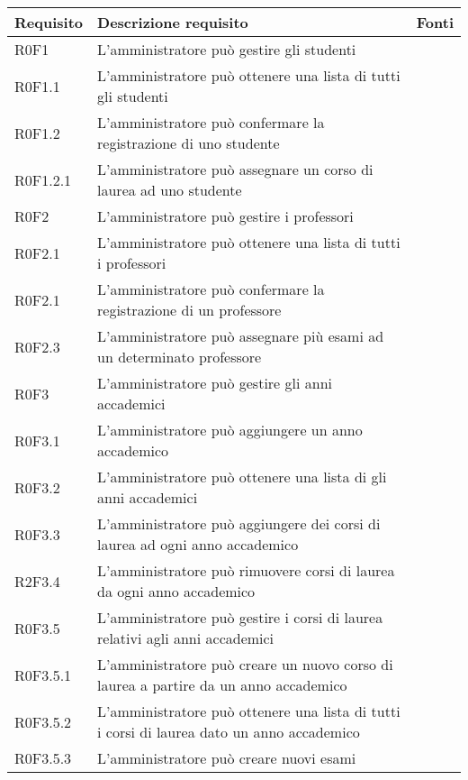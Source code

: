 \documentclass[AnalisiDeiRequisiti.tex]{subfiles}
\begin{document}
\label{table:Tabella di tracciamento requisiti-fonti}
\begin{longtable}[H]{|p{2cm}|p{5cm}|p{5cm}|}
	\hline
	\rowcolor[HTML]{38FFF8} 
	\textbf{Requisito} & \textbf{Descrizione requisito} & \textbf{Fonti} \\ \hline
	\endhead
	R0F1 &  L'amministratore può gestire gli studenti &  \\ \hline
	R0F1.1 &  L'amministratore può ottenere una lista di tutti gli studenti &  \\ \hline
	R0F1.2 &  L'amministratore può confermare la registrazione di uno studente &  \\ \hline
	R0F1.2.1 &  L'amministratore può assegnare un corso di laurea ad uno studente &  \\ \hline
	R0F2 &  L'amministratore può gestire i professori &  \\ \hline
	R0F2.1 &  L'amministratore può ottenere una lista di tutti i professori &  \\ \hline
	R0F2.1 &  L'amministratore può confermare la registrazione di un professore &  \\ \hline
	R0F2.3 &  L'amministratore può assegnare più esami ad un determinato professore &  \\ \hline
	R0F3 &  L'amministratore può gestire gli anni accademici &  \\ \hline
	R0F3.1 &  L'amministratore può aggiungere un anno accademico &  \\ \hline
	R0F3.2 &  L'amministratore può ottenere una lista di gli anni accademici &  \\ \hline
	R0F3.3 &  L'amministratore può aggiungere dei corsi di laurea ad ogni anno accademico &  \\ \hline
	R2F3.4 &  L'amministratore può rimuovere corsi di laurea da ogni anno accademico &  \\ \hline
	R0F3.5 &  L'amministratore può gestire i corsi di laurea relativi agli anni accademici &  \\ \hline
	R0F3.5.1 &  L'amministratore può creare un nuovo corso di laurea a partire da un anno accademico &  \\ \hline
	R0F3.5.2 &  L'amministratore può ottenere una lista di tutti i corsi di laurea dato un anno accademico &  \\ \hline
	R0F3.5.3 &  L'amministratore può creare nuovi esami &  \\ \hline

\end{longtable}
\end{document}
